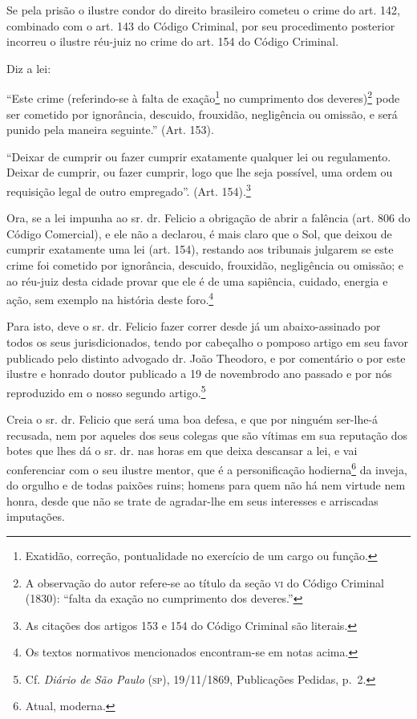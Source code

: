Se pela prisão o ilustre condor do direito brasileiro cometeu o crime do
art. 142, combinado com o art. 143 do Código Criminal, por seu
procedimento posterior incorreu o ilustre réu-juiz no crime do art. 154
do Código Criminal.

Diz a lei:

``Este crime (referindo-se à falta de exação\footnote{ Exatidão,
  correção, pontualidade no exercício de um cargo ou função.} no
cumprimento dos deveres)\footnote{ A observação do autor refere-se ao
  título da seção \textsc{vi} do Código Criminal (1830): ``falta da exação no
  cumprimento dos deveres.''} pode ser cometido por ignorância, descuido,
frouxidão, negligência ou omissão, e será punido pela maneira seguinte.''
(Art. 153).

``Deixar de cumprir ou fazer cumprir exatamente qualquer lei ou
regulamento. Deixar de cumprir, ou fazer cumprir, logo que lhe seja
possível, uma ordem ou requisição legal de outro empregado''. (Art.
154).\footnote{ As citações dos artigos 153 e 154 do Código Criminal
  são literais.}

Ora, se a lei impunha ao sr. dr. Felicio a obrigação de abrir a falência
(art. 806 do Código Comercial), e ele não a declarou, é mais claro que o
Sol, que deixou de cumprir exatamente uma lei (art. 154), restando aos
tribunais julgarem se este crime foi cometido por ignorância, descuido,
frouxidão, negligência ou omissão; e ao réu-juiz desta cidade provar que
ele é de uma sapiência, cuidado, energia e ação, sem exemplo na história
deste foro.\footnote{ Os textos normativos mencionados encontram-se em
  notas acima.}

Para isto, deve o sr. dr. Felicio fazer correr desde já um
abaixo-assinado por todos os seus jurisdicionados, tendo por cabeçalho o
pomposo artigo em seu favor publicado pelo distinto advogado dr. João
Theodoro, e por comentário o por este ilustre e honrado doutor publicado
a 19 de novembrodo ano passado e por nós reproduzido em o nosso segundo
artigo.\footnote{ Cf. \emph{Diário de São Paulo} (\textsc{sp}), 19/11/1869,
  Publicações Pedidas, p.~2.}

Creia o sr. dr. Felicio que será uma boa defesa, e que por ninguém
ser-lhe-á recusada, nem por aqueles dos seus colegas que são vítimas em
sua reputação dos botes que lhes dá o sr. dr. nas horas em que deixa
descansar a lei, e vai conferenciar com o seu ilustre mentor, que é a
personificação hodierna\footnote{ Atual, moderna.} da inveja, do
orgulho e de todas paixões ruins; homens para quem não há nem virtude
nem honra, desde que não se trate de agradar-lhe em seus interesses e
arriscadas imputações.

